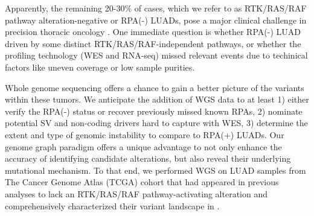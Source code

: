 \documentclass[phd,tocprelim]{cornell}
\begin{document}
Apparently, the remaining 20-30\% of cases, which we refer to as RTK/RAS/RAF pathway alteration-negative or RPA(-) LUADs, pose a major clinical challenge in precision thoracic oncology \cite{Campbell2016-xv}. One immediate question is whether RPA(-) LUAD driven by some distinct RTK/RAS/RAF-independent pathways, or whether the profiling technology (WES and RNA-seq) missed relevant events due to techinical factors like uneven coverage or low sample purities. 

Whole genome sequencing offers a chance to gain a better picture of the variants within these tumors. We anticipate the addition of WGS data to at least 1) either verify the RPA(-) status or recover previously missed known RPAs, 2) nominate potential SV and non-coding drivers hard to capture with WES, 3) determine the extent and type of genomic instability to compare to RPA(+) LUADs. Our genome graph paradigm offers a unique advantage to not only enhance the accuracy of identifying candidate alterations, but also reveal their underlying mutational mechanism. To that end, we performed WGS on LUAD samples from The Cancer Genome Atlas (TCGA) cohort that had appeared in previous analyses to lack an RTK/RAS/RAF pathway-activating alteration \cite{Campbell2016-xv} and comprehensively characterized their variant landscape in .



\end{document}
